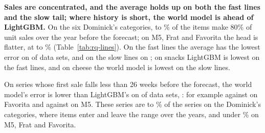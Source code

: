 \textbf{Sales are concentrated, and the average holds up on both the fast lines
and the slow tail; where history is short, the world model is ahead of
LightGBM.} On the six Dominick's categories, \rqFastShareDomLo{} to \rqFastShareDomHi{}\% of the items make 80\% of
unit sales over the year before the forecast; on M5, Frat and Favorita the head
is flatter, at \rqFastShareRestLo{} to \rqFastShareRestHi{}\% (Table~\ref{tab:rq-lines}). On the fast lines the
average has the lowest error on \rqAvgBestFast{} of \rqNineWord{} data sets, and on the slow lines
on \rqAvgBestSlow{}; on snacks LightGBM is lowest on the fast lines, and on cheese the
world model is lowest on the slow lines.

On series whose first sale falls less than 26 weeks before the forecast, the
world model's error is lower than LightGBM's on \rqShortWmBeatsLgb{} of \rqNineWord{} data sets,
\rqShortExceptions{} \rqShortExceptionsVerb{}: for example \rqShortFavWm{} against \rqShortFavLgb{} on Favorita and \rqShortMfiveWm{}
against \rqShortMfiveLgb{} on M5. These series are \rqShortShareDomLo{} to \rqShortShareDomHi{}\% of the series on the Dominick's
categories, where items enter and leave the range over the years, and under \rqShortShareRestMax{}\%
on M5, Frat and Favorita.



